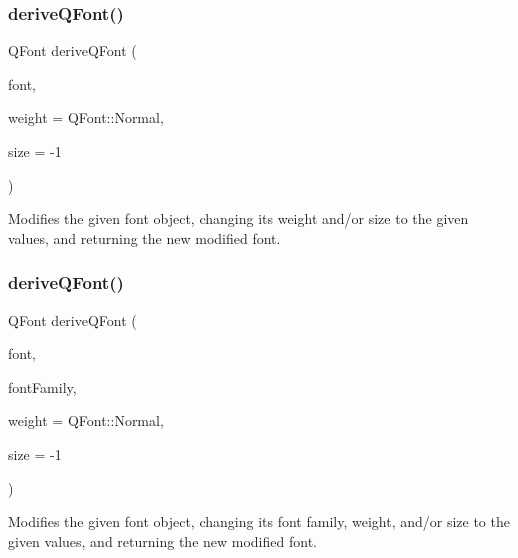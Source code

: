 \subsubsection{\texorpdfstring{derive\+Q\+Font()}{deriveQFont()}\hspace{0.1cm}{\footnotesize\ttfamily [1/4]}}
{\footnotesize\ttfamily Q\+Font derive\+Q\+Font (\begin{DoxyParamCaption}\item[{const Q\+Font \&}]{font,  }\item[{Q\+Font\+::\+Weight}]{weight = {\ttfamily QFont\+:\+:Normal},  }\item[{int}]{size = {\ttfamily -\/1} }\end{DoxyParamCaption})\hspace{0.3cm}{\ttfamily [static]}}



Modifies the given font object, changing its weight and/or size to the given values, and returning the new modified font. 

\mbox{\label{classsgl_1_1GFont_aa0a91decdb8d9bec6e875ebac9d81c97}} 
\subsubsection{\texorpdfstring{derive\+Q\+Font()}{deriveQFont()}\hspace{0.1cm}{\footnotesize\ttfamily [2/4]}}
{\footnotesize\ttfamily Q\+Font derive\+Q\+Font (\begin{DoxyParamCaption}\item[{const Q\+Font \&}]{font,  }\item[{const std\+::string \&}]{font\+Family,  }\item[{Q\+Font\+::\+Weight}]{weight = {\ttfamily QFont\+:\+:Normal},  }\item[{int}]{size = {\ttfamily -\/1} }\end{DoxyParamCaption})\hspace{0.3cm}{\ttfamily [static]}}



Modifies the given font object, changing its font family, weight, and/or size to the given values, and returning the new modified font. 

\mbox{\label{classsgl_1_1GFont_a6fdde28adfdce9b43b7eb4d4a47ca23b}} 
